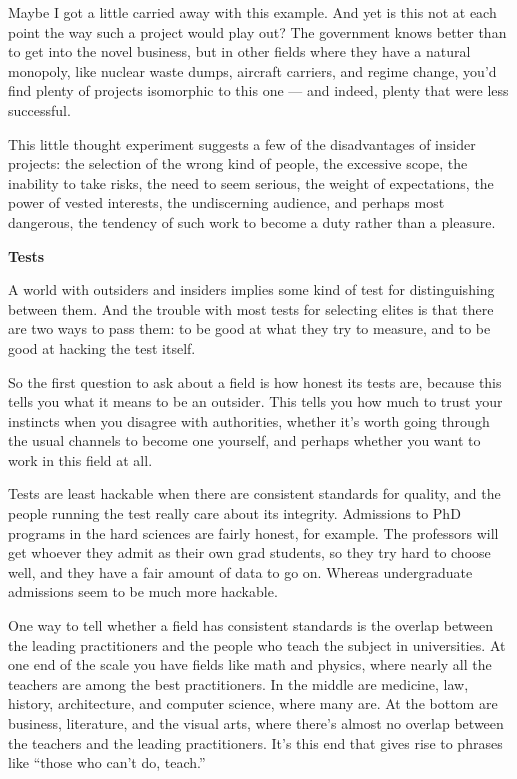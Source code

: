 \documentclass[12pt]{book}
\begin{document}
Maybe I got a little carried away with this example. And yet is this not
at each point the way such a project would play out? The government
knows better than to get into the novel business, but in other fields
where they have a natural monopoly, like nuclear waste dumps, aircraft
carriers, and regime change, you'd find plenty of projects isomorphic to
this one --- and indeed, plenty that were less successful.

This little thought experiment suggests a few of the disadvantages of
insider projects: the selection of the wrong kind of people, the
excessive scope, the inability to take risks, the need to seem serious,
the weight of expectations, the power of vested interests, the
undiscerning audience, and perhaps most dangerous, the tendency of such
work to become a duty rather than a pleasure.

\textbf{Tests}

A world with outsiders and insiders implies some kind of test for
distinguishing between them. And the trouble with most tests for
selecting elites is that there are two ways to pass them: to be good at
what they try to measure, and to be good at hacking the test itself.

So the first question to ask about a field is how honest its tests are,
because this tells you what it means to be an outsider. This tells you
how much to trust your instincts when you disagree with authorities,
whether it's worth going through the usual channels to become one
yourself, and perhaps whether you want to work in this field at all.

Tests are least hackable when there are consistent standards for
quality, and the people running the test really care about its
integrity. Admissions to PhD programs in the hard sciences are fairly
honest, for example. The professors will get whoever they admit as their
own grad students, so they try hard to choose well, and they have a fair
amount of data to go on. Whereas undergraduate admissions seem to be
much more hackable.

One way to tell whether a field has consistent standards is the overlap
between the leading practitioners and the people who teach the subject
in universities. At one end of the scale you have fields like math and
physics, where nearly all the teachers are among the best practitioners.
In the middle are medicine, law, history, architecture, and computer
science, where many are. At the bottom are business, literature, and the
visual arts, where there's almost no overlap between the teachers and
the leading practitioners. It's this end that gives rise to phrases like
``those who can't do, teach.''
\end{document}
